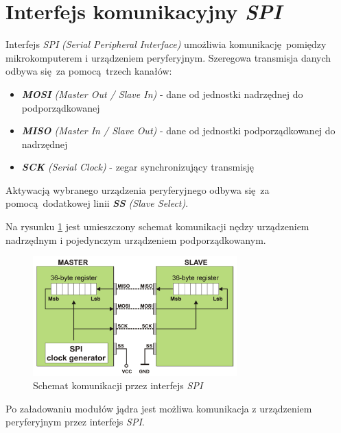 \documentclass[eng,printmode]{mgr}
\begin{document}
\section{Interfejs komunikacyjny \emph{SPI}}

Interfejs \emph{SPI} \emph{(Serial Peripheral Interface)} umożliwia komunikację pomiędzy mikrokomputerem i urządzeniem peryferyjnym. Szeregowa transmisja danych odbywa się za pomocą trzech kanałów\cite{broadcom}:

\begin{itemize}
  \item{\emph{\textbf{MOSI} (Master Out / Slave In)} - dane od jednostki nadrzędnej do podporządkowanej}
  \item{\emph{\textbf{MISO} (Master In / Slave Out)} - dane od jednostki podporządkowanej do nadrzędnej}
  \item{\emph{\textbf{SCK} (Serial Clock)} - zegar synchronizujący transmisję}
\end{itemize}

Aktywacją wybranego urządzenia peryferyjnego odbywa się za pomocą dodatkowej linii \emph{\textbf{SS} (Slave Select)}.

Na rysunku \ref{spi} jest umieszczony schemat komunikacji nędzy urządzeniem nadrzędnym i pojedynczym urządzeniem podporządkowanym.

\begin{figure}[!ht]
    \centering
    \includegraphics[width=0.7\textwidth]{Figures/spi3.png} 
    \caption{Schemat komunikacji przez interfejs \emph{SPI}}
    \label{spi}
\end{figure}

Po załadowaniu modułów jądra jest możliwa komunikacja z urządzeniem peryferyjnym przez interfejs \emph{SPI}.



\end{document}
